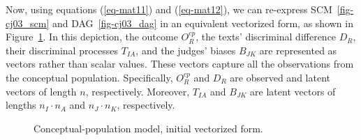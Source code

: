 \documentclass[
  authoryear,
  review,
  1p]{elsarticle}
\begin{document}
Now, using equations (\ref{eq-mat11}) and (\ref{eq-mat12}), we can
re-express SCM~\ref{fig-cj03_scm} and DAG~\ref{fig-cj03_dag} in an
equivalent vectorized form, as shown in Figure~\ref{fig-cj04}. In this
depiction, the outcome \(O^{cp}_{R}\), the texts' discriminal difference
\(D_{R}\), their discriminal processes \(T_{IA}\), and the judges'
biases \(B_{JK}\) are represented as vectors rather than scalar values.
These vectors capture all the observations from the conceptual
population. Specifically, \(O^{cp}_{R}\) and \(D_{R}\) are observed and
latent vectors of length \(n\), respectively. Moreover, \(T_{IA}\) and
\(B_{JK}\) are latent vectors of lengths \(n_{I} \cdot n_{A}\) and
\(n_{J} \cdot n_{K}\), respectively.

\begin{figure}[H]

\begin{minipage}{\linewidth}

\centering{

\[
\begin{aligned}
  O^{cp}_{R} & := f_{O}(D_{R}) \\
  D_{R} & := f_{D}(T_{IA}, B_{JK})
\end{aligned}
\]

}


\end{minipage}%
\newline
\begin{minipage}{\linewidth}



\end{minipage}%

\caption{\label{fig-cj04}Conceptual-population model, initial vectorized
form.}

\end{figure}%
\end{document}
